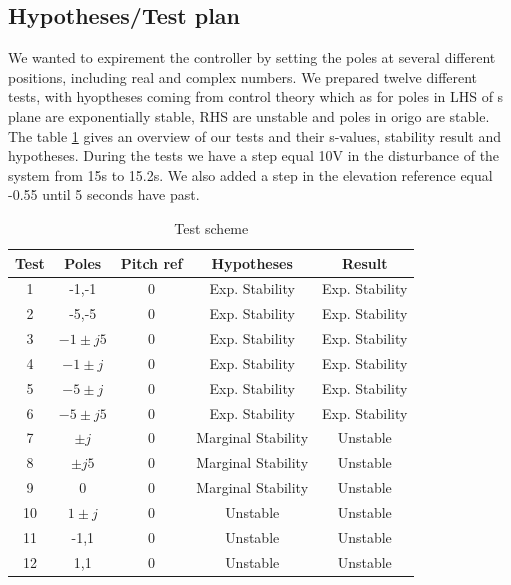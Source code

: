 \subsection{Hypotheses/Test plan}
We wanted to expirement the controller by setting the poles at several different positions, including real and complex numbers.
We prepared twelve different tests, with hyoptheses coming from control theory which as for poles in LHS of s plane are exponentially stable, RHS are unstable and poles in origo are stable.
The table \ref{tab:testskjema_lab1} gives an overview of our tests and their s-values, stability result and hypotheses.
During the tests we have a step equal 10V in the disturbance of the system from 15s to 15.2s. We also added a step in the elevation reference equal -0.55 until 5 seconds have past.
\begin{table}[h]
\centering
{} %
    \begin{tabular}{||c c c c c||} 
     \hline
     Test & Poles & Pitch ref & Hypotheses & Result \\ [0.5ex] 
     \hline\hline
     1 & -1,-1 & 0 & Exp. Stability & Exp. Stability \\ 
     \hline
     2 & -5,-5 & 0 & Exp. Stability & Exp. Stability \\
     \hline
     3 & $-1\pm j5$  & 0 & Exp. Stability & Exp. Stability  \\
     \hline
     4 & $-1\pm j$ & 0 & Exp. Stability & Exp. Stability \\
     \hline
     5 & $-5\pm j$ & 0 & Exp. Stability & Exp. Stability \\  
     \hline
     6 & $-5\pm j5$ & 0 & Exp. Stability & Exp. Stability \\ 
     \hline
     7 & $\pm j$ & 0 & Marginal Stability & Unstable \\  
     \hline
     8 & $\pm j5$ & 0 & Marginal Stability & Unstable \\ 
     \hline
     9 & $0$ & 0 & Marginal Stability & Unstable \\ 
     \hline
     10 & $1\pm j$ & 0 & Unstable & Unstable \\ 
     \hline
     11 & -1,1 & 0 & Unstable & Unstable \\ 
     \hline
     12 & 1,1 & 0 & Unstable & Unstable \\ [1ex]
     \hline
    \end{tabular}
    \caption{Test scheme}
    \label{tab:testskjema_lab1}
\end{table}
